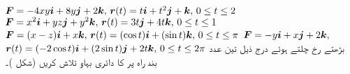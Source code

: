 \(\kvec{F}=-4xy\ai+8y\aj+2\ak,\, \kvec{r}(t)=t\ai+t^2\aj+\ak,\, 0\le t\le 2\)
\(\kvec{F}=x^2\ai+yz\aj+y^2\ak,\, \kvec{r}(t)=3t\aj+4t\ak,\, 0\le t\le 1\)
\(\kvec{F}=(x-z)\ai+x\ak,\, \kvec{r}(t)=(\cos t)\ai+(\sin t)\ak,\, 0\le t\le \pi\)
\wf{\unexpanded{
\(\pi\)
}}
\(\kvec{F}=-y\ai+x\aj+2\ak,\)\\\( \kvec{r}(t)=(-2\cos t)\ai+(2\sin t)\aj+2t\ak,\, 0\le t\le 2\pi\)
بڑھتے   رخ چلتے ہوئے درج ذیل تین عدد بند راہ پر  کا دائری بہاو تلاش کریں (شکل )۔
